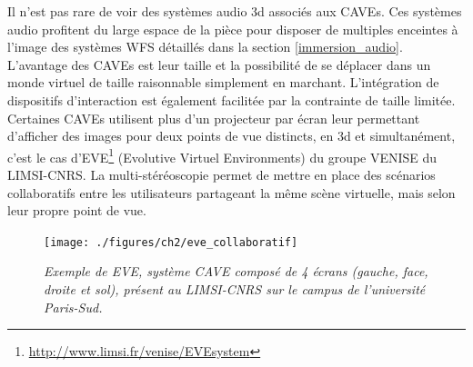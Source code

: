 Il n'est pas rare de voir des systèmes audio 3d associés aux CAVEs. Ces systèmes audio profitent du large espace de la pièce pour disposer de multiples enceintes à l'image des systèmes WFS détaillés dans la section \ref{immersion_audio}.
L'avantage des CAVEs est leur taille et la possibilité de se déplacer dans un monde virtuel de taille raisonnable simplement en marchant. L'intégration de dispositifs d'interaction est également facilitée par la contrainte de taille limitée. 
Certaines CAVEs utilisent plus d'un projecteur par écran leur permettant d'afficher des images pour deux points de vue distincts, en 3d et simultanément, c'est le cas d'EVE\footnote{\url{http://www.limsi.fr/venise/EVEsystem}} (Evolutive Virtuel Environments) du groupe VENISE du LIMSI-CNRS. La multi-stéréoscopie permet de mettre en place des scénarios collaboratifs entre les utilisateurs partageant la même scène virtuelle, mais selon leur propre point de vue.

\begin{figure}
  \centering
  {\texttt{[image: ./figures/ch2/eve\_collaboratif]}}
    \caption[Système CAVE, EVE du LIMSI-CNRS.]{{\it Exemple de EVE, système CAVE composé de 4 écrans (gauche, face, droite et sol), présent au LIMSI-CNRS sur le campus de l'université Paris-Sud.}}
  \label{Fig:eve_collaboratif}
  \hspace{0.3cm}
\end{figure}

